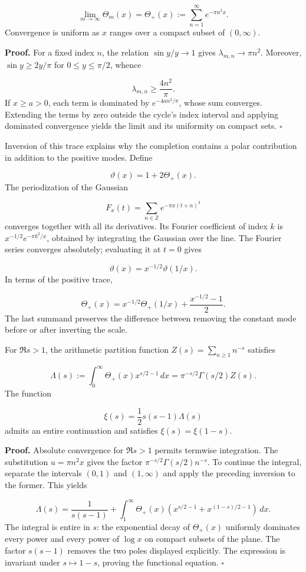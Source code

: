 \[
\lim_{m\to\infty}\Theta_m(x)
=\Theta_+(x):=\sum_{n=1}^{\infty}e^{-\pi n^2x}.
\]
Convergence is uniform as \(x\) ranges over a compact subset of \((0,\infty)\).

\textbf{Proof.} For a fixed index \(n\), the relation \(\sin y/y\to1\) gives \(\lambda_{m,n}\to\pi n^2\). Moreover, \(\sin y\geq2y/\pi\) for \(0\leq y\leq\pi/2\), whence

\[
\lambda_{m,n}\geq\frac{4n^2}{\pi}.
\]
If \(x\geq a>0\), each term is dominated by \(e^{-4an^2/\pi}\), whose sum converges. Extending the terms by zero outside the cycle's index interval and applying dominated convergence yields the limit and its uniformity on compact sets. \hfill\(\square\)

Inversion of this trace explains why the completion contains a polar contribution in addition to the positive modes. Define

\[
\vartheta(x)=1+2\Theta_+(x).
\]
The periodization of the Gaussian

\[
F_x(t)=\sum_{n\in\mathbb Z}e^{-\pi x(t+n)^2}
\]
converges together with all its derivatives. Its Fourier coefficient of index \(k\) is \(x^{-1/2}e^{-\pi k^2/x}\), obtained by integrating the Gaussian over the line. The Fourier series converges absolutely; evaluating it at \(t=0\) gives

\[
\vartheta(x)=x^{-1/2}\vartheta(1/x).
\]
In terms of the positive trace,

\[
\Theta_+(x)=x^{-1/2}\Theta_+(1/x)+\frac{x^{-1/2}-1}{2}.
\]
The last summand preserves the difference between removing the constant mode before or after inverting the scale.

For \(\Re s>1\), the arithmetic partition function \(Z(s)=\sum_{n\geq1}n^{-s}\) satisfies

\[
\Lambda(s):=\int_0^\infty\Theta_+(x)x^{s/2-1}\,dx
=\pi^{-s/2}\Gamma(s/2)Z(s).
\]
The function

\[
\xi(s)=\frac12s(s-1)\Lambda(s)
\]
admits an entire continuation and satisfies \(\xi(s)=\xi(1-s)\).

\textbf{Proof.} Absolute convergence for \(\Re s>1\) permits termwise integration. The substitution \(u=\pi n^2x\) gives the factor \(\pi^{-s/2}\Gamma(s/2)n^{-s}\). To continue the integral, separate the intervals \((0,1)\) and \((1,\infty)\) and apply the preceding inversion to the former. This yields

\[
\Lambda(s)=\frac1{s(s-1)}
+\int_1^\infty\Theta_+(x)
\left(x^{s/2-1}+x^{(1-s)/2-1}\right)\,dx.
\]
The integral is entire in \(s\): the exponential decay of \(\Theta_+(x)\) uniformly dominates every power and every power of \(\log x\) on compact subsets of the plane. The factor \(s(s-1)\) removes the two poles displayed explicitly. The expression is invariant under \(s\mapsto1-s\), proving the functional equation. \hfill\(\square\)

